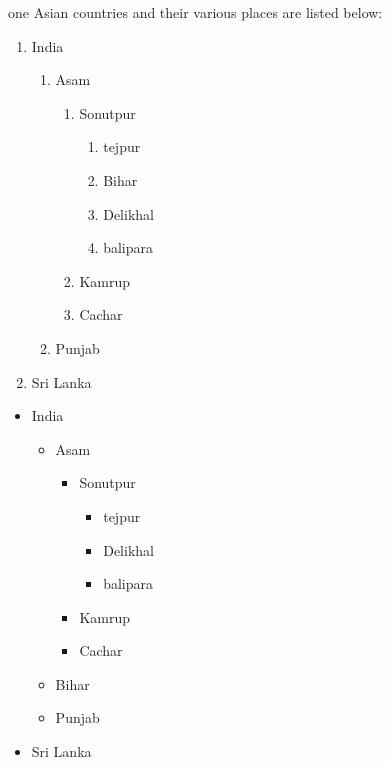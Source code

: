 \documentclass{article}
\begin{document}
one Asian countries and their various places are listed below:
\begin{enumerate}
    \item India
    \medskip %
    \begin{enumerate}
        \item Asam
        \begin{enumerate}
            \item Sonutpur
            \begin{enumerate}
                \item tejpur
                \item Bihar\label{biharr} %
                \item Delikhal
                \item balipara
                \medskip %
            \end{enumerate}
            \item Kamrup
            \item Cachar
            \medskip %
        \end{enumerate}
        \item Punjab
    \end{enumerate}
    \medskip %
    \item Sri Lanka
\end{enumerate}


\pagebreak
\begin{itemize}
    \item India
    \begin{itemize}
        \item Asam
        \begin{itemize}
            \item Sonutpur
            \begin{itemize}
                \item tejpur
                \item Delikhal
                \item balipara
            \end{itemize}
            \item Kamrup
            \item Cachar
        \end{itemize}
        \item Bihar
        \item Punjab
    \end{itemize}
    \item Sri Lanka
\end{itemize}
\end{document}
